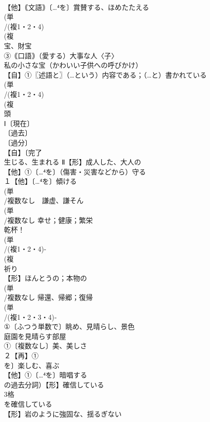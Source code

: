 \documentclass[8pt]{extreport}
\begin{document}
\begin{CJK}{UTF8}{min}
\\	【他】｟文語｠〔…⁴を〕賞賛する、ほめたたえる 
\\	(単
\\	/(複1・2・4)
\\	(複
\\	宝、財宝 
\\	③｟口語｠（愛する）大事な人〈子〉 
\\	私の小さな宝（かわいい子供への呼びかけ）
\\	【自】①〖述語と〗（…という）内容である；（…と）書かれている
\\	(単
\\	/(複1・2・4)
\\	(複
\\	頭 
\\	Ⅰ〔現在〕
\\	〔過去〕
\\	〔過分〕
\\	【自】〔完了
\\	生じる、生まれる Ⅱ【形】成人した、大人の
\\	【他】①〔…⁴を〕（傷害・災害などから）守る 
\\	１【他】〔…⁴を〕傾ける 
\\	(単
\\	/複数なし　謙虚、謙そん 
\\	(単
\\	/複数なし 幸せ；健康；繁栄 
\\	乾杯！
\\	(単
\\	/(複1・2・4)-
\\	(複
\\	祈り 
\\	【形】ほんとうの；本物の 
\\	(単
\\	/複数なし 帰還、帰郷；復帰
\\	(単
\\	/(複1・2・3・4)‐
\\	①〔ふつう単数で〕眺め、見晴らし、景色 
\\	庭園を見晴らす部屋 
\\	①〔複数なし〕美、美しさ 
\\	２【再】①
\\	を〕楽しむ、喜ぶ 
\\	【他】①〔…⁴を〕暗唱する 
\\	の過去分詞）【形】確信している 
\\	3格 
\\	を確信している
\\	【形】岩のように強固な、揺るぎない 

\end{CJK}
\end{document}

